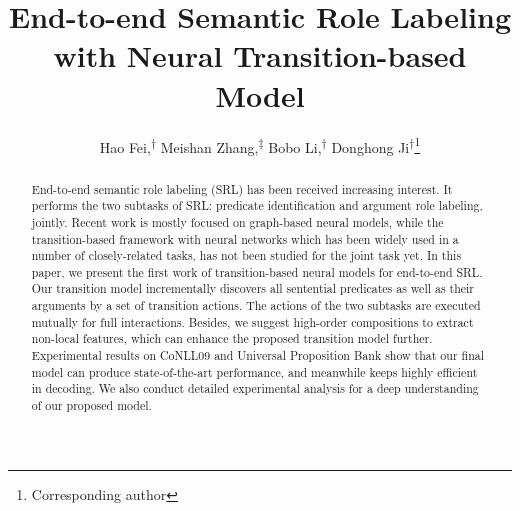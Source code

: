\documentclass[letterpaper]{article} \usepackage{aaai21}  \usepackage{times}  \usepackage{helvet} \usepackage{courier}  \usepackage[hyphens]{url}  \usepackage{graphicx} \urlstyle{rm} \def\UrlFont{\rm}  \usepackage{natbib}  \usepackage{caption}
\begin{document}
\begin{CJK}{UTF8}{gbsn}



\title{End-to-end Semantic Role Labeling with Neural Transition-based Model}





\author{Hao Fei,\textsuperscript{\rm $\dag$} Meishan Zhang,\textsuperscript{\rm $\ddag$} Bobo Li,\textsuperscript{\rm $\dag$} Donghong Ji\textsuperscript{\rm $\dag$}\thanks{Corresponding author}\\
}




\maketitle
\begin{abstract}
End-to-end semantic role labeling (SRL) has been received increasing interest.
It performs the two subtasks of SRL: predicate identification and argument role labeling, jointly.
Recent work is mostly focused on graph-based neural models,
while the transition-based framework with neural networks which has been widely used in a number of closely-related tasks,
has not been studied for the joint task yet.
In this paper, we present the first work of transition-based neural models for end-to-end SRL.
Our transition model incrementally discovers all sentential predicates as well as their arguments by a set of transition actions.
The actions of the two subtasks are executed mutually for full interactions.
Besides, we suggest high-order compositions to extract non-local features, which can enhance the proposed transition model further.
Experimental results on CoNLL09 and Universal Proposition Bank show that our final model can produce state-of-the-art performance,
and meanwhile keeps highly efficient in decoding.
We also conduct detailed experimental analysis for a deep understanding of our proposed model.
\end{abstract}















\end{CJK}
\end{document}
